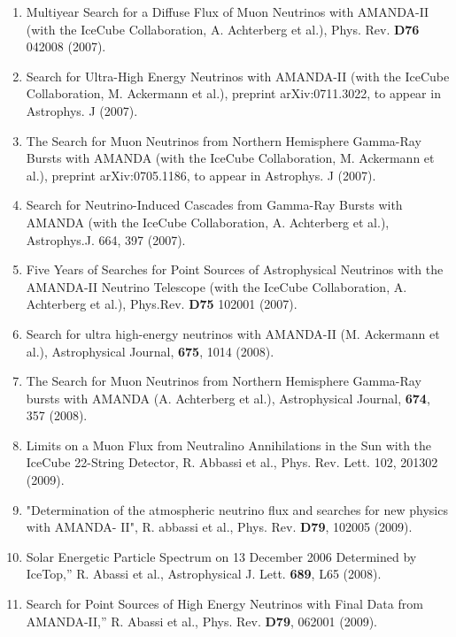 \begin{enumerate}
\item Multiyear Search for a Diffuse Flux of Muon Neutrinos with
  AMANDA-II (with the IceCube Collaboration, A.  Achterberg et al.),
  Phys. Rev. {\bf D76} 042008 (2007).

\item Search for Ultra-High Energy Neutrinos with AMANDA-II (with the
  IceCube Collaboration, M. Ackermann et al.), preprint
  arXiv:0711.3022, to appear in Astrophys. J (2007).

\item The Search for Muon Neutrinos from Northern Hemisphere Gamma-Ray
  Bursts with AMANDA (with the IceCube Collaboration, M. Ackermann et
  al.), preprint arXiv:0705.1186, to appear in Astrophys. J (2007).

\item Search for Neutrino-Induced Cascades from Gamma-Ray Bursts with
  AMANDA (with the IceCube Collaboration, A. Achterberg et al.),
  Astrophys.J. 664, 397 (2007).

\item Five Years of Searches for Point Sources of Astrophysical
  Neutrinos with the AMANDA-II Neutrino Telescope (with the IceCube
  Collaboration, A. Achterberg et al.), Phys.Rev. {\bf D75} 102001
  (2007).

\item Search for ultra high-energy neutrinos with AMANDA-II
  (M. Ackermann et al.), Astrophysical Journal, {\bf 675}, 1014
  (2008).

\item The Search for Muon Neutrinos from Northern Hemisphere Gamma-Ray
  bursts with AMANDA (A. Achterberg et al.), Astrophysical Journal,
  {\bf 674}, 357 (2008).

\item Limits on a Muon Flux from Neutralino Annihilations in the Sun
  with the IceCube 22-String Detector, R. Abbassi et al.,
  Phys. Rev. Lett. 102, 201302 (2009).

\item "Determination of the atmospheric neutrino flux and searches for
  new physics with AMANDA- II", R. abbassi et al., Phys. Rev. {\bf
    D79}, 102005 (2009).

\item Solar Energetic Particle Spectrum on 13 December 2006 Determined
  by IceTop,” R. Abassi et al., Astrophysical J. Lett. {\bf 689}, L65
  (2008).

\item Search for Point Sources of High Energy Neutrinos with Final
  Data from AMANDA-II,” R. Abassi et al., Phys. Rev. {\bf D79}, 062001
  (2009).


\end{enumerate}
